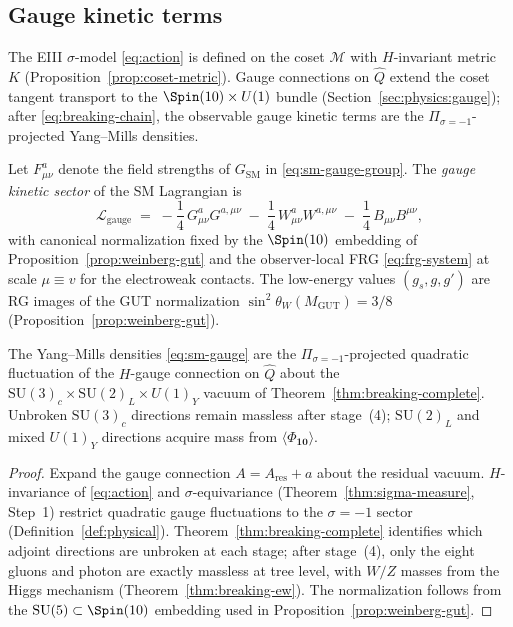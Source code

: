 \subsection{Gauge kinetic terms}
\label{sec:sm-lagrangian:gauge}

The EIII $\sigma$-model \eqref{eq:action} is defined on the coset
$\mathcal{M}$ with $H$-invariant metric $K$ (Proposition~\ref{prop:coset-metric}).
Gauge connections on $\hat Q$ extend the coset tangent transport to the
$\Spin(10)\times U(1)$ bundle (Section~\ref{sec:physics:gauge}); after
\eqref{eq:breaking-chain}, the observable gauge kinetic terms are the
$\Pi_{\sigma=-1}$-projected Yang--Mills densities.

\begin{definition}\label{def:sm-gauge}
Let $F_{\mu\nu}^a$ denote the field strengths of $G_{\mathrm{SM}}$ in
\eqref{eq:sm-gauge-group}. The \emph{gauge kinetic sector} of the SM
Lagrangian is
\begin{equation}\label{eq:sm-gauge}
  \mathcal{L}_{\mathrm{gauge}}
  \;=\;
  -\frac{1}{4}\,G_{\mu\nu}^a G^{a,\mu\nu}
  \;-\;
  \frac{1}{4}\,W_{\mu\nu}^a W^{a,\mu\nu}
  \;-\;
  \frac{1}{4}\,B_{\mu\nu} B^{\mu\nu},
\end{equation}
with canonical normalization fixed by the $\Spin(10)$ embedding of
Proposition~\ref{prop:weinberg-gut} and the observer-local FRG
\eqref{eq:frg-system} at scale $\mu\equiv v$ for the electroweak contacts.
The low-energy values $(g_s,g,g')$ are RG images of the GUT normalization
$\sin^2\theta_W(M_{\mathrm{GUT}})=3/8$ (Proposition~\ref{prop:weinberg-gut}).
\end{definition}

\begin{lemma}[Gauge kinetic terms from $\Pi_{\sigma=-1}$]
\label{lem:sm-gauge-derived}
The Yang--Mills densities \eqref{eq:sm-gauge} are the $\Pi_{\sigma=-1}$-projected
quadratic fluctuation of the $H$-gauge connection on $\hat Q$ about the
$\mathrm{SU}(3)_c\times\mathrm{SU}(2)_L\times U(1)_Y$ vacuum of
Theorem~\ref{thm:breaking-complete}. Unbroken $\mathrm{SU}(3)_c$ directions
remain massless after stage~(4); $\mathrm{SU}(2)_L$ and mixed
$U(1)_Y$ directions acquire mass from $\langle\Phi_{\mathbf{10}}\rangle$.
\end{lemma}

\begin{proof}
Expand the gauge connection $A=A_{\mathrm{res}}+a$ about the residual vacuum.
$H$-invariance of \eqref{eq:action} and $\sigma$-equivariance
(Theorem~\ref{thm:sigma-measure}, Step~1) restrict quadratic gauge
fluctuations to the $\sigma=-1$ sector (Definition~\ref{def:physical}).
Theorem~\ref{thm:breaking-complete} identifies which adjoint directions are
unbroken at each stage; after stage~(4), only the eight gluons and photon are
exactly massless at tree level, with $W/Z$ masses from the Higgs mechanism
(Theorem~\ref{thm:breaking-ew}). The normalization follows from the
$\mathrm{SU}(5)\subset\Spin(10)$ embedding used in
Proposition~\ref{prop:weinberg-gut}.
\end{proof}

